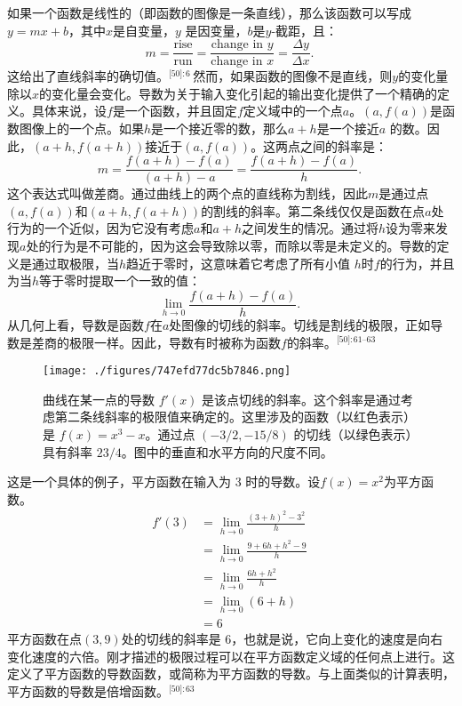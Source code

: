如果一个函数是线性的（即函数的图像是一条直线），那么该函数可以写成\(y = mx + b\)，其中\(x\)是自变量，\(y\) 是因变量，\(b\)是\(y\)-截距，且：
\[
m = \frac{\text{rise}}{\text{run}} = \frac{\text{change in } y}{\text{change in } x} = \frac{\Delta y}{\Delta x}.~
\]
这给出了直线斜率的确切值。\(^\text{[50]: 6 }\)  然而，如果函数的图像不是直线，则\(y\)的变化量除以\(x\)的变化量会变化。导数为关于输入变化引起的输出变化提供了一个精确的定义。具体来说，设\(f\)是一个函数，并且固定\(f\)定义域中的一个点\(a\)。\((a, f(a))\)是函数图像上的一个点。如果\(h\)是一个接近零的数，那么\(a + h\)是一个接近\(a\) 的数。因此，\((a + h, f(a + h))\)接近于\((a, f(a))\)。这两点之间的斜率是：
\[
m = \frac{f(a+h) - f(a)}{(a+h) - a} = \frac{f(a+h) - f(a)}{h}.~
\]
这个表达式叫做差商。通过曲线上的两个点的直线称为割线，因此\(m\)是通过点\((a, f(a))\)和\((a + h, f(a + h))\)的割线的斜率。第二条线仅仅是函数在点\(a\)处行为的一个近似，因为它没有考虑\(a\)和\(a + h\)之间发生的情况。通过将\(h\)设为零来发现\(a\)处的行为是不可能的，因为这会导致除以零，而除以零是未定义的。导数的定义是通过取极限，当\(h\)趋近于零时，这意味着它考虑了所有小值 \(h\)时\(f\)的行为，并且为当\(h\)等于零时提取一个一致的值：
\[
\lim_{h \to 0} \frac{f(a+h) - f(a)}{h}.~
\]
从几何上看，导数是函数\(f\)在\(a\)处图像的切线的斜率。切线是割线的极限，正如导数是差商的极限一样。因此，导数有时被称为函数\(f\)的斜率。\(^\text{[50]: 61–63 }\)  
\begin{figure}[ht]
\centering
\texttt{[image: ./figures/747efd77dc5b7846.png]}
\caption{曲线在某一点的导数 \( f'(x) \) 是该点切线的斜率。这个斜率是通过考虑第二条线斜率的极限值来确定的。这里涉及的函数（以红色表示）是 \( f(x) = x^3 - x \)。通过点 \((-3/2, -15/8)\) 的切线（以绿色表示）具有斜率 \( 23/4 \)。图中的垂直和水平方向的尺度不同。} \label{fig_Calcul_8}
\end{figure}
这是一个具体的例子，平方函数在输入为 3 时的导数。设\(f(x) = x^2\)为平方函数。
\[
\begin{aligned}
f'(3) &= \lim_{h \to 0} \frac{(3+h)^2 - 3^2}{h} \\
&= \lim_{h \to 0} \frac{9 + 6h + h^2 - 9}{h} \\
&= \lim_{h \to 0} \frac{6h + h^2}{h} \\
&= \lim_{h \to 0} (6 + h) \\
&= 6
\end{aligned}~
\]
平方函数在点\((3, 9)\)处的切线的斜率是 6，也就是说，它向上变化的速度是向右变化速度的六倍。刚才描述的极限过程可以在平方函数定义域的任何点上进行。这定义了平方函数的导数函数，或简称为平方函数的导数。与上面类似的计算表明，平方函数的导数是倍增函数。\(^\text{[50]: 63 }\) 
